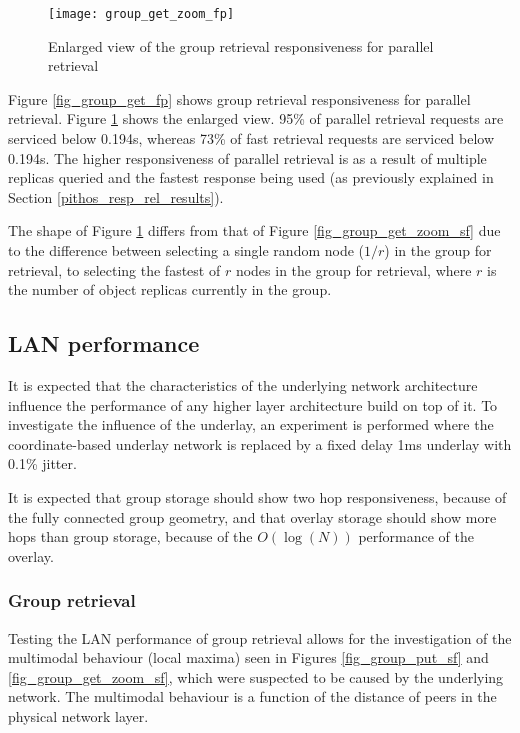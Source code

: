 \begin{figure}[htbp]
 \centering
 \texttt{[image: group\_get\_zoom\_fp]}
 \caption{Enlarged view of the group retrieval responsiveness for parallel retrieval}
 \label{fig_group_get_zoom_fp}
\end{figure}
%
Figure \ref{fig_group_get_fp} shows group retrieval responsiveness for parallel retrieval. Figure \ref{fig_group_get_zoom_fp} shows the enlarged view. 95\% of parallel retrieval requests are serviced below 0.194s, whereas 73\% of fast retrieval requests are serviced below 0.194s. The higher responsiveness of parallel retrieval is as a result of multiple replicas queried and the fastest response being used (as previously explained in Section \ref{pithos_resp_rel_results}).

The shape of Figure \ref{fig_group_get_zoom_fp} differs from that of Figure \ref{fig_group_get_zoom_sf} due to the difference between selecting a single random node ($1/r$) in the group for retrieval, to selecting the fastest of $r$ nodes in the group for retrieval, where $r$ is the number of object replicas currently in the group.

\subsection{LAN performance}
\label{lan_retrieval}

It is expected that the characteristics of the underlying network architecture influence the performance of any higher layer architecture build on top of it. To investigate the influence of the underlay, an experiment is performed where the coordinate-based underlay network is replaced by a fixed delay 1ms underlay with 0.1\% jitter.

It is expected that group storage should show two hop responsiveness, because of the fully connected group geometry, and that overlay storage should show more hops than group storage, because of the $O(\log(N))$ performance of the overlay.

\subsubsection{Group retrieval}

Testing the LAN performance of group retrieval allows for the investigation of the multimodal behaviour (local maxima) seen in Figures \ref{fig_group_put_sf} and \ref{fig_group_get_zoom_sf}, which were suspected to be caused by the underlying network. The multimodal behaviour is a function of the distance of peers in the physical network layer.


